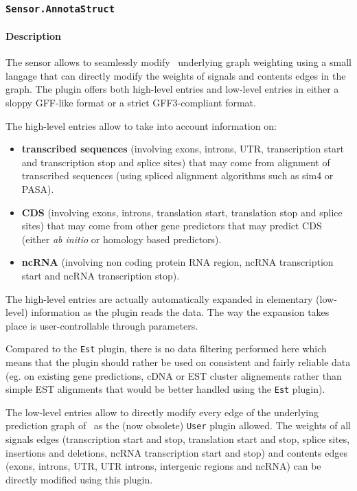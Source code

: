 
\subsubsection{\texttt{Sensor.AnnotaStruct}}
\label{annotastruct}
\paragraph{Description}

The sensor allows to seamlessly modify \EuGene\ underlying graph
weighting using a small langage that can directly modify the weights
of signals and contents edges in the graph. The plugin offers both
high-level entries and low-level entries in either a sloppy GFF-like
format or a strict GFF3-compliant format.

The high-level entries allow to take into account information on:
\begin{itemize}
\item \textbf{transcribed sequences} (involving exons, introns, UTR,
  transcription start and transcription stop and splice sites) that
  may come from alignment of transcribed sequences (using spliced
  alignment algorithms such as sim4 or PASA).
\item \textbf{CDS} (involving exons, introns, translation start,
  translation stop and splice sites) that may come from other gene
  predictors that may predict CDS (either \emph{ab initio} or homology based
  predictors).
\item \textbf{ncRNA} (involving non coding protein RNA region, ncRNA transcription start and ncRNA transcription stop).
\end{itemize}
The high-level entries are actually automatically expanded in
elementary (low-level) information as the plugin reads the data. The
way the expansion takes place is user-controllable through parameters.

Compared to the \texttt{Est} plugin, there is no data filtering
performed here which means that the plugin should rather be used on
consistent and fairly reliable data (eg. on existing gene predictions,
cDNA or EST cluster alignements rather than simple EST alignments that
would be better handled using the \texttt{Est} plugin).

The low-level entries allow to directly modify every edge of the
underlying prediction graph of \EuGene\ as the (now obsolete)
\texttt{User} plugin allowed. The weights of all signals edges
(transcription start and stop, translation start and stop, splice
sites, insertions and deletions, ncRNA transcription start and stop) 
and contents edges (exons, introns,
UTR, UTR introns, intergenic regions and ncRNA) can be directly modified
using this plugin.

